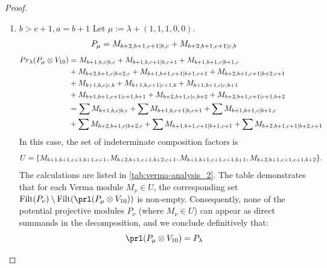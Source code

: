 \begin{proof}
\begin{enumerate}
\begin{enumerate}
      \item $b>c+1 ,a=b+1$
        Let $\mu:=\lambda + (1,1,1,0,0) $. 
        \begin{equation}\notag
          \begin{aligned}
            P_{\mu} = M_{b+2,b+1,c+1|b,c}
+M_{b+2,b+1,c+1|c,b}
          \end{aligned}
        \end{equation}
        \begin{equation}\notag
          \begin{aligned}
            Pr_{\lambda}(P_\mu \otimes V_{10}) &= 
M_{b+1,b,c|b,c}
+M_{b+1,b,c+1|b,c+1}
+M_{b+1,b+1,c|b+1,c}\\
                                            &
+M_{b+2,b+1,c|b+2,c}
+M_{b+1,b+1,c+1|b+1,c+1}
+M_{b+2,b+1,c+1|b+2,c+1}\\
                                            &
+M_{b+1,b,c|c,b}
+M_{b+1,b,c+1|c+1,b}
+M_{b+1,b+1,c|c,b+1}\\
                                            &
+M_{b+1,b+1,c+1|c+1,b+1}
+M_{b+2,b+1,c|c,b+2}
+M_{b+2,b+1,c+1|c+1,b+2} \\
                                               &=
\sum M_{b+1,b,c|b,c}
+\sum M_{b+1,b,c+1|b,c+1}
+\sum M_{b+1,b+1,c|b+1,c}\\
                                            &
+\sum M_{b+2,b+1,c|b+2,c}
+\sum M_{b+1,b+1,c+1|b+1,c+1}
+\sum M_{b+2,b+1,c+1|b+2,c+1}
          \end{aligned}
        \end{equation}
        In this case, the set of indeterminate composition factors is 
\begin{equation}\notag
  \begin{aligned}
     U = \{M_{b+1,b+1,c+1,b+1,c+1},M_{b+2,b+1,c+1,b+2,c+1},M_{b+1,b+1,c+1,c+1,b+1},M_{b+2,b+1,c+1,c+1,b+2}\}.
  \end{aligned}
\end{equation}
        The calculations are listed in \cref{tab:verma-analysis_2}. The table demonstrates that for each Verma module $M_\nu \in U$, the corresponding set $\operatorname{Filt}(P_\nu) \setminus \operatorname{Filt}(\prl(P_\mu \otimes V_{10}))$ is non-empty. Consequently, none of the potential projective modules $P_\nu$ (where $M_\nu \in U$) can appear as direct summands in the decomposition, and we conclude definitively that:
\[
  \prl(P_\mu \otimes V_{10}) = P_\lambda
\]
\begin{table}[htbp]
\centering
\caption{Calculation of Verma modules in $\operatorname{Filt}(P_*) \setminus \operatorname{Filt}(\prl(P_\lambda \otimes V_6)) $ } \label{tab:verma-analysis_2}

\end{table}
\end{enumerate}
\end{enumerate}
\end{proof}

